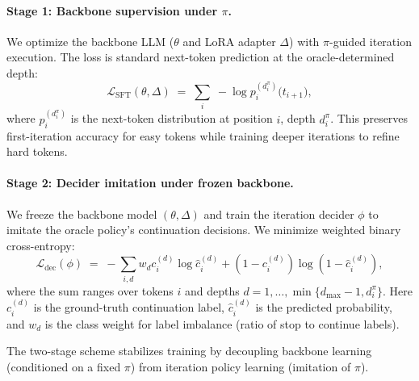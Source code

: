 \paragraph{Stage 1: Backbone supervision under $\pi$.}
We optimize the backbone LLM ($\theta$ and LoRA adapter $\Delta$) with $\pi$-guided iteration execution.
The loss is standard next-token prediction at the oracle-determined depth:
\[
\mathcal{L}_{\text{SFT}}(\theta,\Delta)
\;=\;
\sum_i \; -\log p_i^{(d_i^{\pi})}\!\big(t_{i+1}\big),
\]
where $p_i^{(d_i^{\pi})}$ is the next-token distribution at position $i$, depth $d_i^{\pi}$.
This preserves first-iteration accuracy for easy tokens while training deeper iterations to refine hard tokens.

\paragraph{Stage 2: Decider imitation under frozen backbone.}
We freeze the backbone model $(\theta,\Delta)$ and train the iteration decider $\phi$ to imitate the oracle policy's continuation decisions.
We minimize weighted binary cross-entropy:
\[
\mathcal{L}_{\text{dec}}(\phi)
\;=\;
-\sum_{i,d} w_d 
c_i^{(d)} \log \hat{c}_i^{(d)} + (1-c_i^{(d)})\log(1-\hat{c}_i^{(d)}),
\]
where the sum ranges over tokens $i$ and depths $d=1,\ldots,\min\{d_{\max}-1, d_i^{\pi}\}$. Here $c_i^{(d)}$ is the ground-truth continuation label, $\hat{c}_i^{(d)}$ is the predicted probability, and $w_d$ is the class weight for label imbalance (ratio of stop to continue labels).



The two-stage scheme stabilizes training by decoupling backbone learning (conditioned on a fixed $\pi$) from iteration policy learning (imitation of $\pi$).
